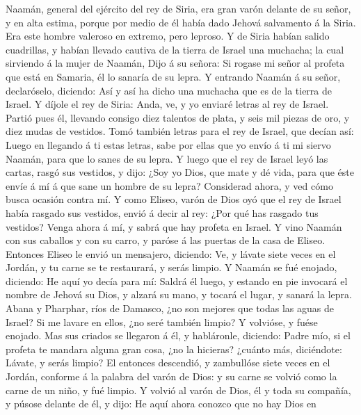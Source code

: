  Naamán, general del ejército del rey de Siria, era gran
varón delante de su señor, y en alta estima, porque por medio de él
había dado Jehová salvamento á la Siria. Era este hombre valeroso en
extremo, pero leproso.  Y de Siria habían salido
cuadrillas, y habían llevado cautiva de la tierra de Israel una
muchacha; la cual sirviendo á la mujer de Naamán,  Dijo á
su señora: Si rogase mi señor al profeta que está en Samaria, él lo
sanaría de su lepra.  Y entrando Naamán á su señor,
declaróselo, diciendo: Así y así ha dicho una muchacha que es de la
tierra de Israel.  Y díjole el rey de Siria: Anda, ve, y
yo enviaré letras al rey de Israel. Partió pues él, llevando consigo
diez talentos de plata, y seis mil piezas de oro, y diez mudas de
vestidos.  Tomó también letras para el rey de Israel, que
decían así: Luego en llegando á ti estas letras, sabe por ellas que yo
envío á ti mi siervo Naamán, para que lo sanes de su lepra.
 Y luego que el rey de Israel leyó las cartas, rasgó sus
vestidos, y dijo: ¿Soy yo Dios, que mate y dé vida, para que éste envíe
á mí á que sane un hombre de su lepra? Considerad ahora, y ved cómo
busca ocasión contra mí.  Y como Eliseo, varón de Dios oyó
que el rey de Israel había rasgado sus vestidos, envió á decir al rey:
¿Por qué has rasgado tus vestidos? Venga ahora á mí, y sabrá que hay
profeta en Israel.  Y vino Naamán con sus caballos y con
su carro, y paróse á las puertas de la casa de Eliseo. 
Entonces Eliseo le envió un mensajero, diciendo: Ve, y lávate siete
veces en el Jordán, y tu carne se te restaurará, y serás limpio.
 Y Naamán se fué enojado, diciendo: He aquí yo decía para
mí: Saldrá él luego, y estando en pie invocará el nombre de Jehová su
Dios, y alzará su mano, y tocará el lugar, y sanará la lepra.
 Abana y Pharphar, ríos de Damasco, ¿no son mejores que
todas las aguas de Israel? Si me lavare en ellos, ¿no seré también
limpio? Y volvióse, y fuése enojado.  Mas sus criados se
llegaron á él, y habláronle, diciendo: Padre mío, si el profeta te
mandara alguna gran cosa, ¿no la hicieras? ¿cuánto más, diciéndote:
Lávate, y serás limpio?  El entonces descendió, y
zambullóse siete veces en el Jordán, conforme á la palabra del varón de
Dios: y su carne se volvió como la carne de un niño, y fué limpio.
 Y volvió al varón de Dios, él y toda su compañía, y
púsose delante de él, y dijo: He aquí ahora conozco que no hay Dios en
